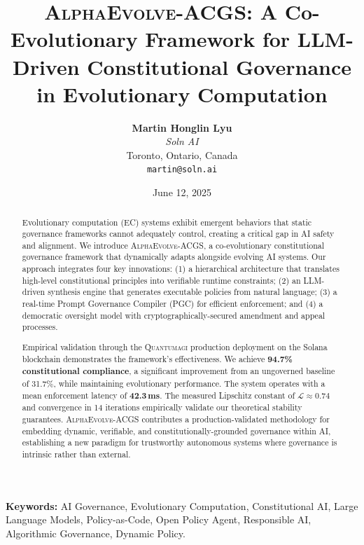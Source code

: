 \documentclass[10pt,twocolumn]{article}
\newcommand{\acgs}{\textsc{AlphaEvolve-ACGS}}
\newcommand{\quantumagi}{\textsc{Quantumagi}}
\newcommand{\lipschitz}{\mathcal{L}}
\theoremstyle{definition}
\begin{document}
\title{\textbf{\acgs{}: A Co-Evolutionary Framework for LLM-Driven Constitutional Governance in Evolutionary Computation}}

\author{
    \textbf{Martin Honglin Lyu}\\
    \textit{Soln AI}\\
    Toronto, Ontario, Canada\\
    \texttt{martin@soln.ai}
}

\date{June 12, 2025}

\maketitle

\begin{abstract}
Evolutionary computation (EC) systems exhibit emergent behaviors that static governance frameworks cannot adequately control, creating a critical gap in AI safety and alignment. We introduce \acgs{}, a co-evolutionary constitutional governance framework that dynamically adapts alongside evolving AI systems. Our approach integrates four key innovations: (1) a hierarchical architecture that translates high-level constitutional principles into verifiable runtime constraints; (2) an LLM-driven synthesis engine that generates executable policies from natural language; (3) a real-time Prompt Governance Compiler (PGC) for efficient enforcement; and (4) a democratic oversight model with cryptographically-secured amendment and appeal processes.

Empirical validation through the \quantumagi{} production deployment on the Solana blockchain demonstrates the framework's effectiveness. We achieve \textbf{94.7\% constitutional compliance}, a significant improvement from an ungoverned baseline of 31.7\%, while maintaining evolutionary performance. The system operates with a mean enforcement latency of \textbf{42.3\,ms}. The measured Lipschitz constant of $\lipschitz \approx 0.74$ and convergence in 14 iterations empirically validate our theoretical stability guarantees. \acgs{} contributes a production-validated methodology for embedding dynamic, verifiable, and constitutionally-grounded governance within AI, establishing a new paradigm for trustworthy autonomous systems where governance is intrinsic rather than external.
\end{abstract}

\textbf{Keywords:} AI Governance, Evolutionary Computation, Constitutional AI, Large Language Models, Policy-as-Code, Open Policy Agent, Responsible AI, Algorithmic Governance, Dynamic Policy.
\end{document}
